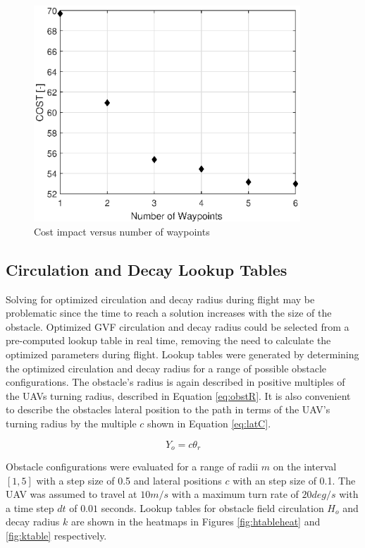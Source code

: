 \documentclass[numbered,pdftex]{ohio-etd}
\begin{document}
\begin{figure}[H]
	\centering
	\includegraphics[width=10cm]{Figures/Waypoints/costVnumWpts}
	\caption{Cost impact versus number of waypoints}
	\label{fig:numWaypoints}
\end{figure}



\subsection{Circulation and Decay Lookup Tables}
Solving for optimized circulation and decay radius during flight may be problematic since the time to reach a solution increases with the size of the obstacle. Optimized GVF circulation and decay radius could be selected from a pre-computed lookup table in real time, removing the need to calculate the optimized parameters during flight. Lookup tables were generated by determining the optimized circulation and decay radius for a range of possible obstacle configurations. The obstacle's radius is again described in positive multiples of the UAVs turning radius, described in Equation \ref{eq:obstR}. It is also convenient to describe the obstacles lateral position to the path in terms of the UAV's turning radius by the multiple $c$ shown in Equation \ref{eq:latC}.

\begin{equation}
\label{eq:latC}
Y_o = c \theta_r
\end{equation}

Obstacle configurations were evaluated for a range of radii $m$ on the interval $[1,5]$ with a step size of 0.5 and lateral positions $c$ with an step size of 0.1. The UAV was assumed to travel at $10m/s$ with a maximum turn rate of $20 deg/s$ with a time step $dt$ of $0.01$ seconds. Lookup tables for obstacle field circulation $H_o$ and decay radius $k$ are shown in the heatmaps in Figures \ref{fig:htableheat} and \ref{fig:ktable} respectively. 
\end{document}
